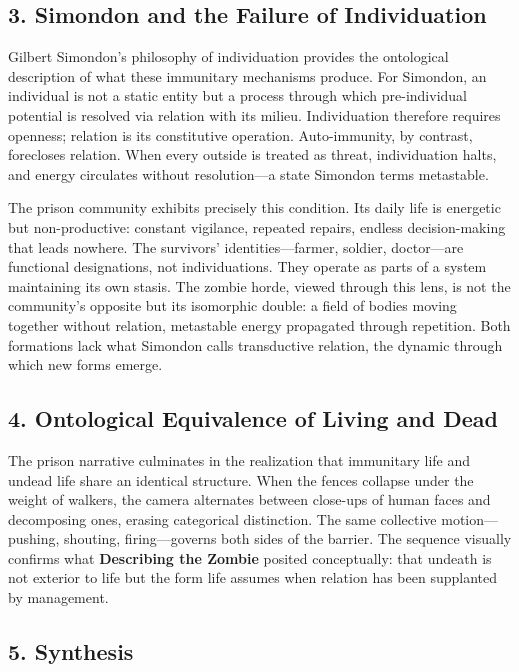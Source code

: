 \documentclass[11pt]{article}
\begin{document}
\subsection*{3. Simondon and the Failure of Individuation}
\label{sec:orgb747bee}

Gilbert Simondon’s philosophy of individuation provides the ontological description of what these immunitary mechanisms produce.  For Simondon, an individual is not a static entity but a process through which pre-individual potential is resolved via relation with its milieu.  Individuation therefore requires openness; relation is its constitutive operation.  Auto-immunity, by contrast, forecloses relation.  When every outside is treated as threat, individuation halts, and energy circulates without resolution—a state Simondon terms metastable.  

The prison community exhibits precisely this condition.  Its daily life is energetic but non-productive: constant vigilance, repeated repairs, endless decision-making that leads nowhere.  The survivors’ identities—farmer, soldier, doctor—are functional designations, not individuations.  They operate as parts of a system maintaining its own stasis.  The zombie horde, viewed through this lens, is not the community’s opposite but its isomorphic double: a field of bodies moving together without relation, metastable energy propagated through repetition.  Both formations lack what Simondon calls transductive relation, the dynamic through which new forms emerge.  
\subsection*{4. Ontological Equivalence of Living and Dead}
\label{sec:orga6900c0}

The prison narrative culminates in the realization that immunitary life and undead life share an identical structure.  When the fences collapse under the weight of walkers, the camera alternates between close-ups of human faces and decomposing ones, erasing categorical distinction.  The same collective motion—pushing, shouting, firing—governs both sides of the barrier.  The sequence visually confirms what \textbf{Describing the Zombie} posited conceptually: that undeath is not exterior to life but the form life assumes when relation has been supplanted by management.  
\subsection*{5. Synthesis}
\label{sec:org0ba010e}
\end{document}
